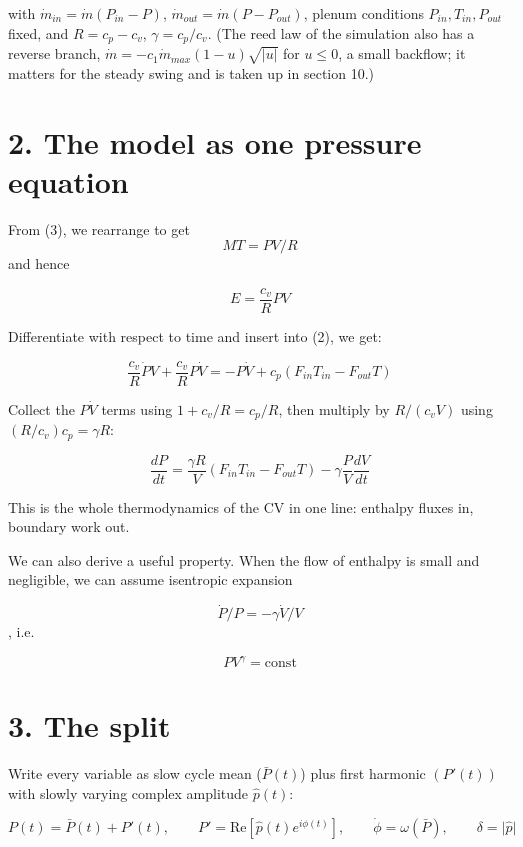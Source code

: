 \documentclass[11pt]{article}
\begin{document}
with $ \dot{m}_{in} =  \dot{m}(P_{in}-P)$, $ \dot{m}_{out} =  \dot{m}(P-P_{out})$, plenum conditions $P_{in}, T_{in}, P_{out}$ fixed, and $R = c_p - c_v$, $\gamma = c_p/c_v$. (The reed law of the simulation also has a reverse branch, $\dot m = -c_1\dot m_{max}(1-u)\sqrt{\lvert u\rvert}$ for $u \le 0$, a small backflow; it matters for the steady swing and is taken up in section 10.)

\section*{2. The model as one pressure equation}

From (3), we rearrange to get
\[
MT = PV/R
\]
 and hence

\[
E = \frac{c_v}{R}PV
\]

 Differentiate with respect to time and insert into (2), we get:

\[
\frac{c_v}{R}\dot PV + \frac{c_v}{R}P\dot V = -P\dot V + c_p(F_{in}T_{in} - F_{out}T)
\]

Collect the $P\dot V$ terms using $1 + c_v/R = c_p/R$, then multiply by $R/(c_vV)$ using $(R/c_v)c_p = \gamma R$:

\begin{equation}
\frac{dP}{dt} = \frac{\gamma R}{V}\left(F_{in}T_{in} - F_{out}T\right) - \gamma\frac{P}{V}\frac{dV}{dt} \tag{7}
\end{equation}

This is the whole thermodynamics of the CV in one line: enthalpy fluxes in, boundary work out.

We can also derive a useful property. When the flow of enthalpy is small and negligible, we can assume isentropic expansion

\begin{equation}
\dot P/P = -\gamma\dot V/V \tag{8}
\end{equation}
, i.e.

\[
PV^{\gamma} = \mathrm{const}
\]

\section*{3. The split}

Write every variable as slow cycle mean ($\bar P(t)$) plus first harmonic $(P'(t))$ with slowly varying complex amplitude $\hat p(t)$:

\begin{equation}
P(t) = \bar P(t) + P'(t), \qquad P' = \mathrm{Re}\left[\hat p(t)e^{i\phi(t)}\right], \qquad \dot\phi = \omega(\bar P), \qquad \delta = \lvert\hat p\rvert \tag{9}
\end{equation}
\end{document}
